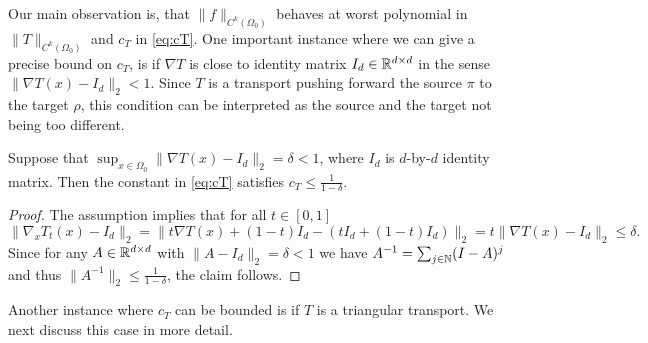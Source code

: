 Our main observation is, that $\|f\|_{C^k(\Omega_0)}$ behaves at worst
polynomial in $\|T\|_{C^k(\Omega_0)}$ and $c_T$ in \eqref{eq:cT}. One
important instance where we can give a precise bound on $c_T$, is if
$\nabla T$ is close to identity matrix $I_d\in\mathbb{R}^{d\times d}$ in the
sense $\|\nabla T(x)-I_d\|_2<1$. Since $T$ is a transport pushing
forward the source $\pi$ to the target $\rho$, this condition can be
interpreted as the source and the target not being too different.
\begin{lemma}
  Suppose that  $\sup_{x\in\Omega_0}\|\nabla
  T(x)-I_d\|_{2}=\delta<1$, where $I_d$ is $d$-by-$d$ identity matrix. Then the constant in \eqref{eq:cT}
  satisfies $c_T\le \frac{1}{1-\delta}$.
\end{lemma}
\begin{proof}
  The assumption implies that for all $t\in [0,1]$
  \begin{equation*}
    \|\nabla_x T_t(x)-I_d\|_2
    =\|t \nabla T(x)+(1-t)I_d-(tI_d+(1-t)I_d)\|_2
    = t \|\nabla T(x)-I_d\|_2 \le\delta.
  \end{equation*}
  Since for any $A\in \mathbb{R}^{d\times d}$ with $\|A-I_d\|_2=\delta<1$
  we have $A^{-1}=\sum_{j\in\mathbb{N}}(I-A)^j$ and thus
  $\|A^{-1}\|_2\le \frac{1}{1-\delta}$, the claim follows.
\end{proof}

Another instance where $c_T$ can be bounded is if $T$ is a triangular
transport. We next discuss this case in more detail.

